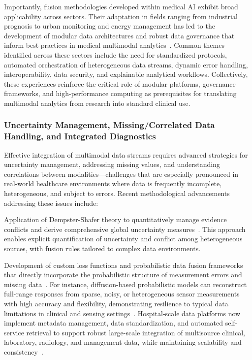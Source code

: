 \documentclass[sigconf]{acmart}
\begin{document}
Importantly, fusion methodologies developed within medical AI exhibit broad applicability across sectors. Their adaptation in fields ranging from industrial prognosis to urban monitoring and energy management has led to the development of modular data architectures and robust data governance that inform best practices in medical multimodal analytics~\cite{ref66,ref67,ref68,ref70,ref71,ref72,ref75,ref84}. Common themes identified across these sectors include the need for standardized protocols, automated orchestration of heterogeneous data streams, dynamic error handling, interoperability, data security, and explainable analytical workflows. Collectively, these experiences reinforce the critical role of modular platforms, governance frameworks, and high-performance computing as prerequisites for translating multimodal analytics from research into standard clinical use.

\subsubsection{Uncertainty Management, Missing/Correlated Data Handling, and Integrated Diagnostics}

Effective integration of multimodal data streams requires advanced strategies for uncertainty management, addressing missing values, and understanding correlations between modalities—challenges that are especially pronounced in real-world healthcare environments where data is frequently incomplete, heterogeneous, and subject to errors. Recent methodological advancements addressing these issues include:

Application of Dempster-Shafer theory to quantitatively manage evidence conflicts and derive comprehensive global uncertainty measures~\cite{ref73}. This approach enables explicit quantification of uncertainty and conflict among heterogeneous sources, with fusion rules tailored to complex data environments.

Development of custom loss functions and probabilistic data fusion frameworks that directly incorporate the probabilistic structure of measurement errors and missing data~\cite{ref73,ref76,ref77,ref84}. For instance, diffusion-based probabilistic models can reconstruct full-range responses from sparse, noisy, or heterogeneous sensor measurements with high accuracy and flexibility, demonstrating resilience to typical data limitations in clinical and sensing settings~\cite{ref77}. Hospital-scale data platforms now implement metadata management, data standardization, and automated self-service retrieval to support robust large-scale integration of multisource clinical, laboratory, radiology, and management data, while maintaining scalability and consistency~\cite{ref84}.
\end{document}
